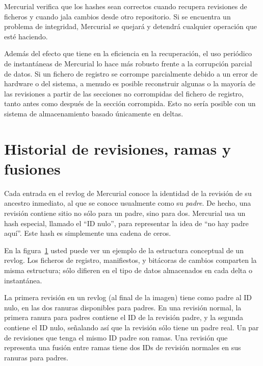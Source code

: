 Mercurial verifica que los hashes sean correctos cuando recupera
revisiones de ficheros y cuando jala cambios desde otro repositorio.
Si se encuentra un problema de integridad, Mercurial se quejará y
detendrá cualquier operación que esté haciendo.

Además del efecto que tiene en la eficiencia en la recuperación, el
uso periódico de instantáneas de Mercurial lo hace más robusto frente
a la corrupción parcial de datos. Si un fichero de registro se
corrompe parcialmente debido a un error de hardware o del sistema, a
menudo es posible reconstruir algunas o la mayoría de las revisiones a
partir de las secciones no corrompidas del fichero de registro, tanto
antes como después de la sección corrompida. Esto no sería posible con
un sistema de almacenamiento basado únicamente en deltas.

\section{Historial de revisiones, ramas y fusiones}

Cada entrada en el revlog de Mercurial conoce la identidad de la
revisión de su ancestro inmediato, al que se conoce usualmente como su
\emph{padre}. De hecho, una revisión contiene sitio no sólo para un
padre, sino para dos. Mercurial usa un hash especial, llamado el
``ID nulo'', para representar la idea de ``no hay padre aquí''. Este
hash es simplemente una cadena de ceros.

En la figura~\ref{fig:concepts:revlog} usted puede ver un ejemplo de
la estructura conceptual de un revlog. Los ficheros de registro,
manifiestos, y bitácoras de cambios comparten la misma estructura;
sólo difieren en el tipo de datos almacenados en cada delta o
instantánea.

La primera revisión en un revlog (al final de la imagen) tiene como
padre al ID nulo, en las dos ranuras disponibles para padres. En una
revisión normal, la primera ranura para padres contiene el ID de la
revisión padre, y la segunda contiene el ID nulo, señalando así que la
revisión sólo tiene un padre real. Un par de revisiones que tenga el
mismo ID padre son ramas. Una revisión que representa una fusión entre
ramas tiene dos IDs de revisión normales en sus ranuras para padres.

\begin{figure}[ht]
  \centering
  \caption{}
  \label{fig:concepts:revlog}
\end{figure}

